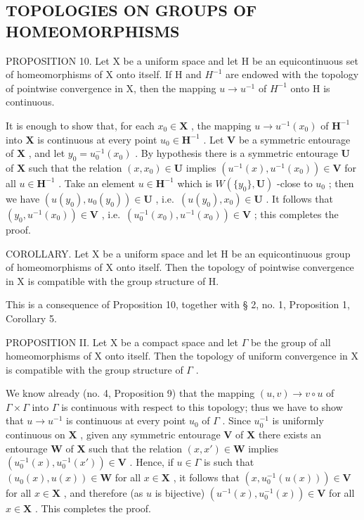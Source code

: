 \subsection{TOPOLOGIES ON GROUPS OF HOMEOMORPHISMS}

PROPOSITION 10. Let X be a uniform space and let H be an equicontinuous set of homeomorphisms of X onto itself. If H and \(H^{-1}\) are endowed with the topology of pointwise convergence in X, then the mapping \(u \rightarrow u^{-1}\) of \(H^{-1}\) onto H is continuous.

It is enough to show that, for each \(x_0 \in \mathbf{X}\) , the mapping \(u \to u^{-1}(x_0)\) of \(\mathbf{H}^{-1}\) into \(\mathbf{X}\) is continuous at every point \(u_0 \in \mathbf{H}^{-1}\) . Let \(\mathbf{V}\) be a symmetric entourage of \(\mathbf{X}\) , and let \(y_0 = u_0^{-1}(x_0)\) . By hypothesis there is a symmetric entourage \(\mathbf{U}\) of \(\mathbf{X}\) such that the relation \((x, x_0) \in \mathbf{U}\) implies \((u^{-1}(x), u^{-1}(x_0)) \in \mathbf{V}\) for all \(u \in \mathbf{H}^{-1}\) . Take an element \(u \in \mathbf{H}^{-1}\) which is \(W(\{y_0\}, \mathbf{U})\) -close to \(u_0\) ; then we have \((u(y_0), u_0(y_0)) \in \mathbf{U}\) , i.e.~\((u(y_0), x_0) \in \mathbf{U}\) . It follows that \((y_0, u^{-1}(x_0)) \in \mathbf{V}\) , i.e.~\((u_0^{-1}(x_0), u^{-1}(x_0)) \in \mathbf{V}\) ; this completes the proof.

COROLLARY. Let X be a uniform space and let H be an equicontinuous group of homeomorphisms of X onto itself. Then the topology of pointwise convergence in X is compatible with the group structure of H.

This is a consequence of Proposition 10, together with § 2, no. 1, Proposition 1, Corollary 5.

PROPOSITION II. Let X be a compact space and let \(\Gamma\) be the group of all homeomorphisms of X onto itself. Then the topology of uniform convergence in X is compatible with the group structure of \(\Gamma\) .

We know already (no. 4, Proposition 9) that the mapping \((u, v) \to v \circ u\) of \(\Gamma \times \Gamma\) into \(\Gamma\) is continuous with respect to this topology; thus we have to show that \(u \to u^{-1}\) is continuous at every point \(u_0\) of \(\Gamma\) . Since \(u_0^{-1}\) is uniformly continuous on \(\mathbf{X}\) , given any symmetric entourage \(\mathbf{V}\) of \(\mathbf{X}\) there exists an entourage \(\mathbf{W}\) of \(\mathbf{X}\) such that the relation \((x, x') \in \mathbf{W}\) implies \((u_0^{-1}(x), u_0^{-1}(x')) \in \mathbf{V}\) . Hence, if \(u \in \Gamma\) is such that \((u_0(x), u(x)) \in \mathbf{W}\) for all \(x \in \mathbf{X}\) , it follows that \((x, u_0^{-1}(u(x))) \in \mathbf{V}\) for all \(x \in \mathbf{X}\) , and therefore (as \(u\) is bijective) \((u^{-1}(x), u_0^{-1}(x)) \in \mathbf{V}\) for all \(x \in \mathbf{X}\) . This completes the proof.

